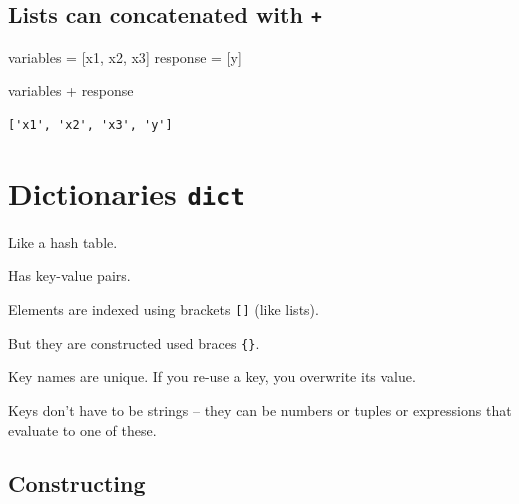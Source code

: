 \documentclass[
  letterpaper,
  DIV=11,
  numbers=noendperiod]{scrreprt}
\newenvironment{Shaded}{\begin{snugshade}}{\end{snugshade}}
\newcommand{\NormalTok}[1]{\textcolor[rgb]{0.00,0.23,0.31}{#1}}
\newcommand{\OperatorTok}[1]{\textcolor[rgb]{0.37,0.37,0.37}{#1}}
\newcommand{\StringTok}[1]{\textcolor[rgb]{0.13,0.47,0.30}{#1}}
\begin{document}
\hypertarget{lists-can-concatenated-with}{%
\section{\texorpdfstring{Lists can concatenated with
\texttt{+}}{Lists can concatenated with +}}\label{lists-can-concatenated-with}}

\begin{Shaded}
\begin{Highlighting}[]
\NormalTok{variables }\OperatorTok{=}\NormalTok{ [}\StringTok{\textquotesingle{}x1\textquotesingle{}}\NormalTok{, }\StringTok{\textquotesingle{}x2\textquotesingle{}}\NormalTok{, }\StringTok{\textquotesingle{}x3\textquotesingle{}}\NormalTok{]}
\NormalTok{response }\OperatorTok{=}\NormalTok{ [}\StringTok{\textquotesingle{}y\textquotesingle{}}\NormalTok{]}
\end{Highlighting}
\end{Shaded}

\begin{Shaded}
\begin{Highlighting}[]
\NormalTok{variables }\OperatorTok{+}\NormalTok{ response}
\end{Highlighting}
\end{Shaded}

\begin{verbatim}
['x1', 'x2', 'x3', 'y']
\end{verbatim}

\hypertarget{dictionaries-dict}{%
\chapter{\texorpdfstring{Dictionaries
\texttt{dict}}{Dictionaries dict}}\label{dictionaries-dict}}

Like a hash table.

Has key-value pairs.

Elements are indexed using brackets \texttt{{[}{]}} (like lists).

But they are constructed used braces \texttt{\{\}}.

Key names are unique. If you re-use a key, you overwrite its value.

Keys don't have to be strings -- they can be numbers or tuples or
expressions that evaluate to one of these.

\hypertarget{constructing-1}{%
\section{Constructing}\label{constructing-1}}
\end{document}
